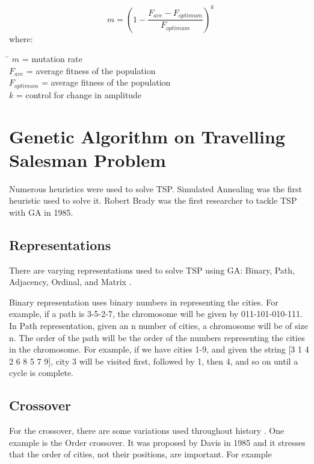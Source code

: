 \begin{equation} \label{DynamicMutation}
	m = (1 -\frac{F_{ave} - F_{optimum}}{F_{optimum}})^k
\end{equation}
where:
\begin{tabbing}
	\= \kill
	$m$\> = mutation rate\\
	$F_{ave}$\> = average fitness of the population\\
	$F_{optimum}$ = average fitness of the population\\
	$k$\> = control for change in amplitude\\
\end{tabbing}

\section{Genetic Algorithm on Travelling Salesman Problem}
\indent \indent Numerous heuristics were used to solve TSP\cite{larranaga1999genetic}. Simulated Annealing was the first heuristic used to solve it. Robert Brady was the first researcher to tackle TSP with GA in 1985.  \par 


\subsection{Representations}
\label{GaRepresentation}
\indent \indent There are varying representations used to solve TSP using GA: Binary, Path, Adjacency, Ordinal, and Matrix \cite{larranaga1999genetic}. \par 

Binary representation uses binary numbers in representing the cities. For example, if a path is 3-5-2-7, the chromosome will be given by 011-101-010-111. In Path representation, given an n number of cities, a chromosome will be of size n. The order of the path will be the order of the numbers representing the cities in the chromosome. For example, if we have cities 1-9, and given the string [3 1 4 2 6 8 5 7 9], city 3 will be visited first, followed by 1, then 4, and so on until a cycle is complete. \par 
\hfill \par 
\hfill \par 


\subsection{Crossover}
\label{GaCrossover}
\indent \indent For the crossover, there are some variations used throughout history \cite{larranaga1999genetic}. One example is the Order crossover. It was proposed by Davis in 1985 and it stresses that the order of cities, not their positions, are important. For example \par 

